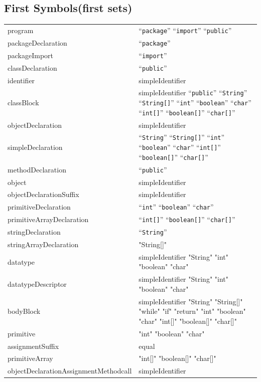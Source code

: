 \subsection{First Symbols(first sets)}
\label{fist_sets}
\noindent
\begin{tabularx}{\linewidth}{YY}
program & ``\texttt{package}'' ``\texttt{import}'' ``\texttt{public}'' \\
packageDeclaration & ``\texttt{package}'' \\
packageImport & ``\texttt{import}'' \\
classDeclaration & ``\texttt{public}'' \\
identifier & simpleIdentifier \\
classBlock & simpleIdentifier ``\texttt{public}'' ``\texttt{String}'' ``\texttt{String[]}'' ``\texttt{int}'' ``\texttt{boolean}'' ``\texttt{char}'' ``\texttt{int[]}'' ``\texttt{boolean[]}'' ``\texttt{char[]}'' \\
objectDeclaration & simpleIdentifier \\
simpleDeclaration & ``\texttt{String}'' ``\texttt{String[]}'' ``\texttt{int}'' ``\texttt{boolean}'' ``\texttt{char}'' ``\texttt{int[]}'' ``\texttt{boolean[]}'' ``\texttt{char[]}'' \\
methodDeclaration & ``\texttt{public}'' \\
object & simpleIdentifier \\
objectDeclarationSuffix & simpleIdentifier \\
primitiveDeclaration & ``\texttt{int}'' ``\texttt{boolean}'' ``\texttt{char}'' \\
primitiveArrayDeclaration & ``\texttt{int[]}'' ``\texttt{boolean[]}'' ``\texttt{char[]}'' \\
stringDeclaration & ``\texttt{String}'' \\
stringArrayDeclaration & "String[]" \\
datatype & simpleIdentifier "String" "int" "boolean" "char" \\
datatypeDescriptor & simpleIdentifier "String" "int" "boolean" "char" \\
bodyBlock & simpleIdentifier "String" "String[]" "while" "if" "return" "int" "boolean" "char" "int[]" "boolean[]" "char[]" \\
primitive & "int" "boolean" "char" \\
assignmentSuffix & equal \\
primitiveArray & "int[]" "boolean[]" "char[]" \\
objectDeclarationAssignmentMethodcall & simpleIdentifier \\

\end{tabularx}
